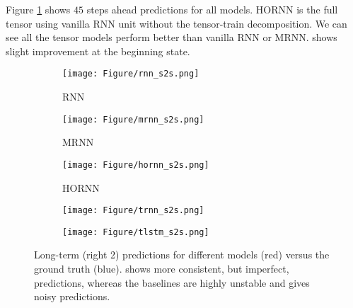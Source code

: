 Figure \ref{fig:long-term} shows $45$ steps ahead predictions for all models. HORNN is the full tensor \trnn{} using vanilla RNN unit without the tensor-train decomposition. We can see all the tensor models perform better than vanilla RNN or MRNN. \trnn{} shows slight improvement at the beginning state.
\begin{figure}[htbp]
\begin{center}
    \begin{subfigure}[b]{0.19\textwidth}
        \texttt{[image: Figure/rnn\_s2s.png]}
        \caption{RNN}
    \end{subfigure}
    \begin{subfigure}[b]{0.19\textwidth}
        \texttt{[image: Figure/mrnn\_s2s.png]}
        \caption{MRNN}
    \end{subfigure}
    \begin{subfigure}[b]{0.19\textwidth}
    \texttt{[image: Figure/hornn\_s2s.png]}
    \caption{HORNN}
\end{subfigure}
    \begin{subfigure}[b]{0.19\textwidth}
        \texttt{[image: Figure/trnn\_s2s.png]}
        \caption{\trnn{}}
    \end{subfigure}
    \begin{subfigure}[b]{0.19\textwidth}
        \texttt{[image: Figure/tlstm\_s2s.png]}
        \caption{\tlstm{}}
    \end{subfigure} %
    \caption{Long-term (right 2) predictions for different models (red) versus the ground truth (blue). \trnn{} shows more consistent, but imperfect, predictions, whereas the baselines are highly unstable and gives noisy predictions. }
    \label{fig:long-term}
\end{center}
\vskip -0.3in
\end{figure}

